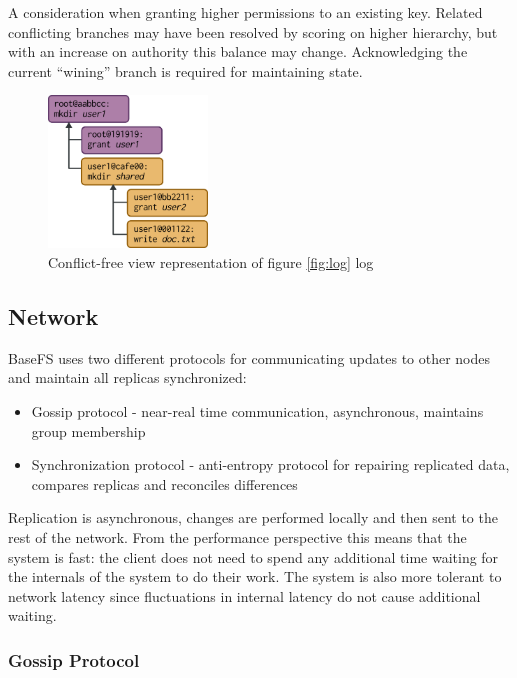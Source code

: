 \documentclass{sig-alternate}
\begin{document}
A consideration when granting higher permissions to an existing key. Related conflicting branches may have been resolved by scoring on higher hierarchy, but with an increase on authority this balance may change. Acknowledging the current ``wining'' branch is required for maintaining state.

\begin{figure}
\centering
\includegraphics[width=120pt]{imgs/view.png}
\caption{Conflict-free view representation of figure \ref{fig:log} log}
\label{fig:view}
\end{figure}


\subsection{Network} \label{network}

BaseFS uses two different protocols for communicating updates to other nodes and maintain all replicas synchronized:

\begin{itemize}
    \item Gossip protocol - near-real time communication, asynchronous, maintains group membership
    \item Synchronization protocol - anti-entropy protocol for repairing replicated data, compares replicas and reconciles differences
\end{itemize}

Replication is asynchronous, changes are performed locally and then sent to the rest of the network. From the performance perspective this means that the system is fast: the client does not need to spend any additional time waiting for the internals of the system to do their work. The system is also more tolerant to network latency since fluctuations in internal latency do not cause additional waiting.

\subsubsection{Gossip Protocol}\label{gossip-protocol}
\end{document}
